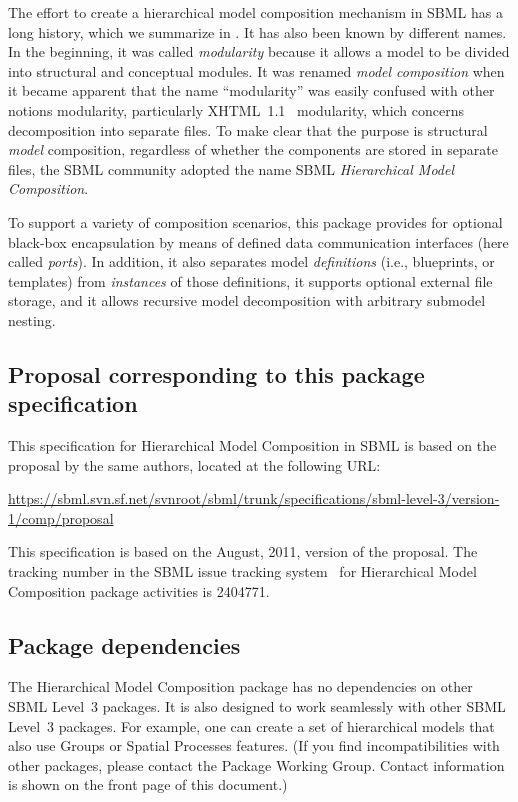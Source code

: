 The effort to create a hierarchical model composition mechanism in SBML
has a long history, which we summarize in .  It has
also been known by different names.  In the beginning, it was called
\emph{modularity} because it allows a model to be divided into
structural and conceptual modules.  It was renamed \emph{model
  composition} when it became apparent that the name ``modularity'' was
easily confused with other notions modularity, particularly
XHTML~1.1~\citep{xhtml} modularity, which concerns decomposition into
separate files.  To make clear that the purpose is structural
\emph{model} composition, regardless of whether the components are
stored in separate files, the SBML community adopted the name SBML
\emph{Hierarchical Model Composition}.

To support a variety of composition scenarios, this package provides for
optional black-box encapsulation by means of defined data communication
interfaces (here called \emph{ports}).  In addition, it also separates
model \emph{definitions} (i.e., blueprints, or templates) from
\emph{instances} of those definitions, it supports optional external
file storage, and it allows recursive model decomposition with arbitrary
submodel nesting.


\subsection{Proposal corresponding to this package specification}

This specification for Hierarchical Model Composition in SBML is based on the proposal by the same authors, located at the following URL:

\begin{center}
  \vspace*{1ex}\small
  \url{https://sbml.svn.sf.net/svnroot/sbml/trunk/specifications/sbml-level-3/version-1/comp/proposal}
  \vspace*{1ex}
\end{center}

This specification is based on the August, 2011, version of the
proposal.  The tracking number in the SBML issue tracking
system~\citep{tracker} for Hierarchical Model Composition package
activities is 2404771.


\subsection{Package dependencies}

The Hierarchical Model Composition package has no dependencies on other
SBML Level~3 packages.  It is also designed to work seamlessly with
other SBML Level~3 packages.  For example, one can create a set of
hierarchical models that also use Groups or Spatial Processes features.
(If you find incompatibilities with other packages, please contact the
Package Working Group.  Contact information is shown on the front page
of this document.)


